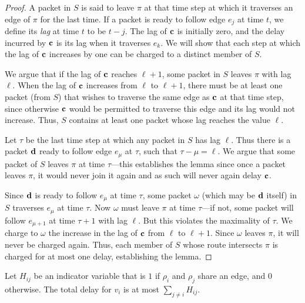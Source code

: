 \begin{proof}
    A packet in $S$ is said to leave $\pi$ at that time step at which
    it traverses an edge of $\pi$ for the last time. If a packet is
    ready to follow edge $e_j$ at time $t$, we define its \emph{lag}
    at time $t$ to be $t-j$. The lag of $\mathbf{c}$ is initially zero,
    and the delay incurred by $\mathbf{c}$ is its lag when it traverses
    $e_k$. We will show that each step at which the lag of $\mathbf{c}$
    increases by one can be charged to a distinct member of $S$.

    We argue that if the lag of $\mathbf{c}$ reaches $\ell+1$, some
    packet in $S$ leaves $\pi$ with lag $\ell$. When the lag of
    $\mathbf{c}$ increases from $\ell$ to $\ell +1$, there must be at
    least one packet (from $S$) that wishes to traverse the same edge
    as $\mathbf{c}$ at that time step, since otherwise $\mathbf{c}$ would be
    permitted to traverse this edge and its lag would not increase.
    Thus, $S$ contains at least one packet whose lag reaches the value
    $\ell$.

    Let $\tau$ be the last time step at which any packet in $S$ has
    lag $\ell$. Thus there is a packet $\mathbf{d}$ ready to follow edge
    $e_{\mu}$ at $\tau$, such that $\tau - \mu = \ell$. We argue that
    some packet of $S$ leaves $\pi$ at time $\tau$---this establishes
    the lemma since once a packet leaves $\pi$, it would never join it
    again and as such will never again delay $\mathbf{c}$.

    Since $\mathbf{d}$ is ready to follow $e_{\mu}$ at time $\tau$, some packet
    $\omega$ (which may be $\mathbf{d}$ itself) in $S$ traverses $e_\mu$ at time
    $\tau$. Now $\omega$ must leave $\pi$ at time $\tau$---if not, some packet will
    follow $e_{\mu+1}$ at time $\tau+1$ with lag $\ell$.  But this
    violates the maximality of $\tau$.  We charge to $\omega$ the increase in the
    lag of $\mathbf{c}$ from $\ell$ to $\ell+1$. Since $\omega$ leaves
    $\pi$, it will never be charged again. Thus, each member of $S$ whose
    route intersects $\pi$ is charged for at most one delay, establishing
    the lemma.
\end{proof}



Let $H_{i j}$ be an indicator variable that is $1$ if $\rho_i$ and
$\rho_j$ share an edge, and $0$ otherwise. The total delay for $v_i$
is at most $\sum_{j \neq i} H_{i j}$.

